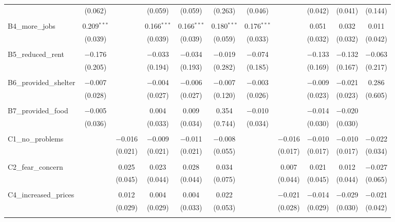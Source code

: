 \begin{table}[H]
\begin{tabular}{@{\extracolsep{4pt}}lcccccccccc}
  & (0.062) &  & (0.059) & (0.059) & (0.263) & (0.046) &  & (0.042) & (0.041) & (0.144) \\ 
  & & & & & & & & & & \\ 
 B4\_more\_jobs & 0.209$^{***}$ &  & 0.166$^{***}$ & 0.166$^{***}$ & 0.180$^{***}$ & 0.176$^{***}$ &  & 0.051 & 0.032 & 0.011 \\ 
  & (0.039) &  & (0.039) & (0.039) & (0.059) & (0.033) &  & (0.032) & (0.032) & (0.042) \\ 
  & & & & & & & & & & \\ 
 B5\_reduced\_rent & $-$0.176 &  & $-$0.033 & $-$0.034 & $-$0.019 & $-$0.074 &  & $-$0.133 & $-$0.132 & $-$0.063 \\ 
  & (0.205) &  & (0.194) & (0.193) & (0.282) & (0.185) &  & (0.169) & (0.167) & (0.217) \\ 
  & & & & & & & & & & \\ 
 B6\_provided\_shelter & $-$0.007 &  & $-$0.004 & $-$0.006 & $-$0.007 & $-$0.003 &  & $-$0.009 & $-$0.021 & 0.286 \\ 
  & (0.028) &  & (0.027) & (0.027) & (0.120) & (0.026) &  & (0.023) & (0.023) & (0.605) \\ 
  & & & & & & & & & & \\ 
 B7\_provided\_food & $-$0.005 &  & 0.004 & 0.009 & 0.354 & $-$0.010 &  & $-$0.014 & $-$0.020 &  \\ 
  & (0.036) &  & (0.033) & (0.034) & (0.744) & (0.034) &  & (0.030) & (0.030) &  \\ 
  & & & & & & & & & & \\ 
 C1\_no\_problems &  & $-$0.016 & $-$0.009 & $-$0.011 & $-$0.008 &  & $-$0.016 & $-$0.010 & $-$0.010 & $-$0.022 \\ 
  &  & (0.021) & (0.021) & (0.021) & (0.055) &  & (0.017) & (0.017) & (0.017) & (0.034) \\ 
  & & & & & & & & & & \\ 
 C2\_fear\_concern &  & 0.025 & 0.023 & 0.028 & 0.034 &  & 0.007 & 0.021 & 0.012 & $-$0.027 \\ 
  &  & (0.045) & (0.044) & (0.044) & (0.075) &  & (0.044) & (0.045) & (0.044) & (0.065) \\ 
  & & & & & & & & & & \\ 
 C4\_increased\_prices &  & 0.012 & 0.004 & 0.004 & 0.022 &  & $-$0.021 & $-$0.014 & $-$0.029 & $-$0.021 \\ 
  &  & (0.029) & (0.029) & (0.033) & (0.053) &  & (0.028) & (0.029) & (0.030) & (0.042) \\ 
  & & & & & & & & & & \\ 

\end{tabular}
\end{table}
